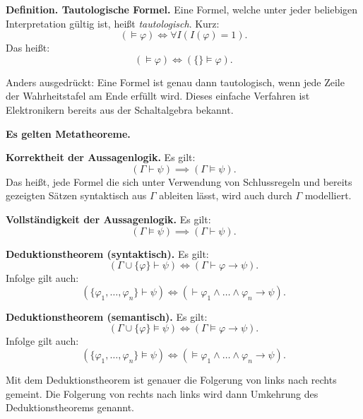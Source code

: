 \documentclass{beamer}
\newcommand{\strong}[1]{\textsf{\textbf{#1}}}
\begin{document}
\begin{frame}
\strong{Definition. Tautologische Formel.}
Eine Formel, welche unter jeder beliebigen Interpretation
gültig ist, heißt \emph{tautologisch}. Kurz:
\[(\models\varphi) \iff \forall I(I(\varphi)=1).\]
Das heißt:
\[(\models\varphi) \iff (\{\}\models\varphi).\]
\end{frame}

\begin{frame}
Anders ausgedrückt: Eine Formel ist genau dann tautologisch,
wenn jede Zeile der Wahrheitstafel am Ende erfüllt wird.
Dieses einfache Verfahren ist Elektronikern bereits aus der
Schaltalgebra bekannt.
\end{frame}

\begin{frame}
\strong{Es gelten Metatheoreme.}
\end{frame}

\begin{frame}
\strong{Korrektheit der Aussagenlogik.}
Es gilt:
\[(\Gamma\vdash\psi)\implies (\Gamma\models\psi).\]
Das heißt, jede Formel die sich unter Verwendung von
Schlussregeln und bereits gezeigten Sätzen syntaktisch aus $\Gamma$
ableiten lässt, wird auch durch $\Gamma$ modelliert.
\end{frame}

\begin{frame}
\strong{Vollständigkeit der Aussagenlogik.}
Es gilt:
\[(\Gamma\models\psi)\implies (\Gamma\vdash\psi).\]
\end{frame}

\begin{frame}
\strong{Deduktionstheorem (syntaktisch).}
Es gilt:
\[(\Gamma\cup\{\varphi\}\vdash\psi)
\iff(\Gamma\vdash\varphi\rightarrow\psi).\]
Infolge gilt auch:
\[(\{\varphi_1,\ldots,\varphi_n\}\vdash\psi)
\iff (\vdash\varphi_1\land\ldots\land\varphi_n\rightarrow\psi).\]
\end{frame}

\begin{frame}
\strong{Deduktionstheorem (semantisch).}
Es gilt:
\[(\Gamma\cup\{\varphi\}\models\psi)
\iff(\Gamma\models\varphi\rightarrow\psi).\]
Infolge gilt auch:
\[(\{\varphi_1,\ldots,\varphi_n\}\models\psi)
\iff (\models\varphi_1\land\ldots\land\varphi_n\rightarrow\psi).\]
\end{frame}

\begin{frame}
Mit dem Deduktionstheorem ist genauer die Folgerung von links nach
rechts gemeint. Die Folgerung von rechts nach links wird dann
Umkehrung des Deduktionstheorems genannt.
\end{frame}
\end{document}
